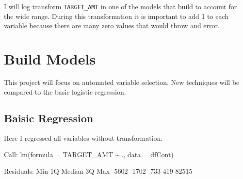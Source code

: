 \documentclass[]{article}
\begin{document}
I will log transform \texttt{TARGET\_AMT} in one of the models that
build to account for the wide range. During this transformation it is
important to add 1 to each variable because there are many zero values
that would throw and error.

\hypertarget{build-models}{%
\section{Build Models}\label{build-models}}

This project will focus on automated variable selection. New techniques
will be compared to the basic logistic regression.

\hypertarget{baisic-regression}{%
\subsection{Baisic Regression}\label{baisic-regression}}

Here I regressed all variables without transformation.

Call: lm(formula = TARGET\_AMT \textasciitilde{} ., data = dfCont)

Residuals: Min 1Q Median 3Q Max -5602 -1702 -733 419 82515
\end{document}
